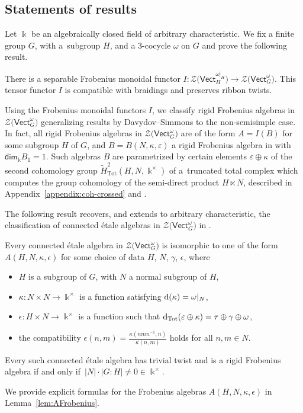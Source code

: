 \documentclass[pdftex]{sigma}
\numberwithin{equation}{section}
\newcommand{\deri}{{\rm d}}
\newcommand{\Tot}{\mathrm{Tot}}
\renewcommand{\dim}{\mathsf{dim}}
\newcommand{\Vect}{\mathsf{Vect}}
\newcommand{\cZ}{\mathcal{Z}}
\newcommand{\rI}{I}
\begin{document}
\subsection{Statements of results}

Let $\Bbbk$ be an algebraically closed field of arbitrary characteristic. We fix a finite group $G$, with a~subgroup $H$, and a $3$-cocycle $\omega$ on $G$ and prove the following result.

\begin{theorem*}%
There is a separable Frobenius monoidal functor $\rI\colon \cZ\big(\Vect_H^{\omega|_{H}}\big)\to \cZ\big(\Vect_G^\omega\big)$. This tensor functor $\rI$ is compatible with braidings and preserves ribbon twists.
\end{theorem*}

Using the Frobenius monoidal functors $\rI$, we classify rigid Frobenius algebras in $\cZ\big(\Vect_G^\omega\big)$ generalizing results by Davydov--Simmons \cite{DS} to the non-semisimple case. In fact, all rigid Frobenius algebras in $\cZ\big(\Vect_G^\omega\big)$ are of the form $A=\rI(B)$ for some subgroup $H$ of $G$, and $B=B(N,\kappa,\varepsilon)$ a rigid Frobenius algebra in \smash{$\cZ\big(\Vect_H^{\omega|_H}\big)$} with $\dim_{\Bbbk}B_1=1$. Such algebras $B$ are parametrized by certain elements $\varepsilon\oplus \kappa$ of the second cohomology group $\widetilde{H}^2_{\Tot}(H,N,\Bbbk^\times)$ of a~truncated total complex \smash{$\big(\widetilde{F}^\bullet_{\Tot}(H,N,\Bbbk^\times), \deri_{\Tot}\big)$} which computes the group cohomology of the semi-direct product $H\ltimes N$, described in Appendix~\ref{appendix:coh-crossed} and \cite[Appendix~A]{DS}.

The following result recovers, and extends to arbitrary characteristic, the classification of connected \'etale algebras in $\cZ\big(\Vect_G^\omega\big)$ in \cite[Theorem~3.15]{DS}.

\begin{theorem*}\label{thm2}
Every connected \'etale algebra in $\cZ\big(\Vect_G^\omega\big)$ is isomorphic to one of the form $A(H,N,\kappa, \epsilon)$ for some choice of data $H$, $N$, $\gamma$, $\epsilon$, where
\begin{itemize}\itemsep=0pt
 \item $H$ is a subgroup of $G$, with $N$ a normal subgroup of $H$,
 \item $\kappa\colon N\times N\to \Bbbk^\times$ is a function satisfying $\deri(\kappa)=\omega|_N$,
 \item $\epsilon\colon H\times N \to \Bbbk^\times$ is a function such that
 $\deri_{\Tot}(\varepsilon\oplus\kappa)=\tau\oplus \gamma \oplus \omega$,
 \item the compatibility $\epsilon(n,m)=\frac{\kappa(nmn^{-1},n)}{\kappa(n,m)}$ holds for all $n,m\in N$.
\end{itemize}
Every such connected \'etale algebra has trivial twist and is a rigid Frobenius algebra if and only if~$|N|\cdot |G:H|\neq 0 \in \Bbbk^{\times}$.
\end{theorem*}
We provide explicit formulas for the Frobenius algebras $A(H,N,\kappa,\epsilon)$ in Lemma~\ref{lem:AFrobenius}.
\end{document}

